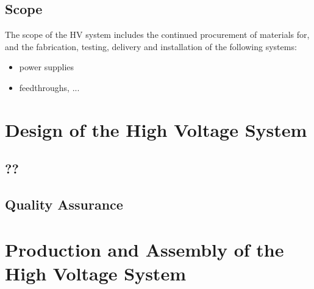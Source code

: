 

\subsection{Scope}
\label{sec:fdsp-hv-scope}

The scope of the HV system includes the continued procurement of materials for, and the fabrication, testing, delivery and installation of the following systems: 


\begin{itemize}
\item power supplies 
\item feedthroughs, ...
\end{itemize}



\section{Design of the High Voltage System}
\label{sec:fdsp-hv-design}




\subsection{??}
\label{sec:fdsp-hv-??}

\subsection{Quality Assurance}
\label{sec:fdsp-hv-qa}




\section{Production and Assembly of the High Voltage System}
\label{sec:fdsp-hv-prod-assy}

